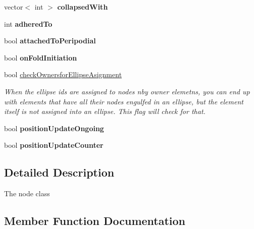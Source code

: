 \begin{DoxyCompactItemize}
\item 
\hypertarget{classNode_ae887e306a904ed17f26851ece9357bbb}{}vector$<$ int $>$ {\bfseries collapsed\+With}\label{classNode_ae887e306a904ed17f26851ece9357bbb}

\item 
\hypertarget{classNode_a484ea8b4f71ea5fdfa1036ed1fabfae0}{}int {\bfseries adhered\+To}\label{classNode_a484ea8b4f71ea5fdfa1036ed1fabfae0}

\item 
\hypertarget{classNode_a62f609723e0516ff02232727575b0a15}{}bool {\bfseries attached\+To\+Peripodial}\label{classNode_a62f609723e0516ff02232727575b0a15}

\item 
\hypertarget{classNode_a913bf9335efdbd81a352b1ef80654f95}{}bool {\bfseries on\+Fold\+Initiation}\label{classNode_a913bf9335efdbd81a352b1ef80654f95}

\item 
\hypertarget{classNode_ad41abb2d4571366c2ba8d3a0b46798b6}{}bool \hyperlink{classNode_ad41abb2d4571366c2ba8d3a0b46798b6}{check\+Ownersfor\+Ellipse\+Asignment}\label{classNode_ad41abb2d4571366c2ba8d3a0b46798b6}

\begin{DoxyCompactList}\small\item\em When the ellipse ids are assigned to nodes nby owner elemetns, you can end up with elements that have all their nodes engulfed in an ellipse, but the element itself is not assigned into an ellipse. This flag will check for that. \end{DoxyCompactList}\item 
\hypertarget{classNode_acf1e1353abc605a027ca492f44cd15bf}{}bool {\bfseries position\+Update\+Ongoing}\label{classNode_acf1e1353abc605a027ca492f44cd15bf}

\item 
\hypertarget{classNode_a73ca1bf9c28cc2ce53177e7722c8fc05}{}bool {\bfseries position\+Update\+Counter}\label{classNode_a73ca1bf9c28cc2ce53177e7722c8fc05}

\end{DoxyCompactItemize}


\subsection{Detailed Description}
The node class 

\subsection{Member Function Documentation}
\hypertarget{classNode_a2c6f029aa3388b8fb122139b1d24b71b}{}
